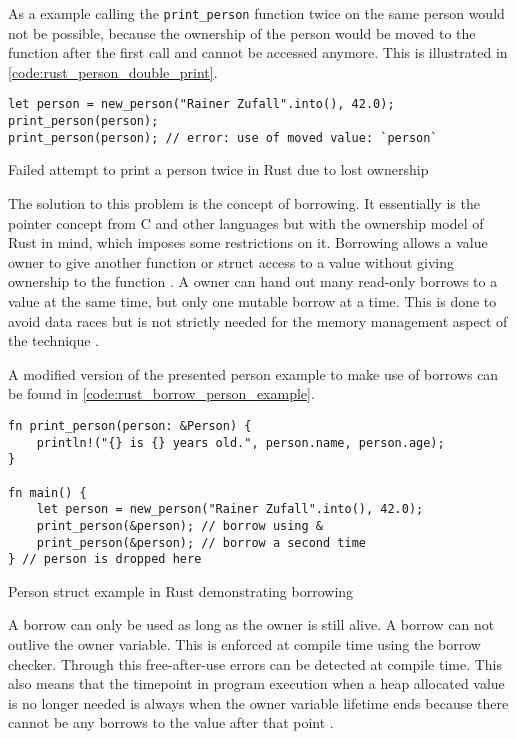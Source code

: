 As a example calling the \texttt{print\_person} function twice on the same person
would not be possible, because the ownership of the person would be moved to the
function after the first call and cannot be accessed anymore.
This is illustrated in \autoref{code:rust_person_double_print}.

\begin{listing}[H] 
    \begin{verbatim}
let person = new_person("Rainer Zufall".into(), 42.0);
print_person(person);
print_person(person); // error: use of moved value: `person`
    \end{verbatim}
    \caption{Failed attempt to print a person twice in Rust due to lost ownership}
    \label{code:rust_person_double_print}
\end{listing}

The solution to this problem is the concept of borrowing.
It essentially is the pointer concept from C and other languages but with
the ownership model of Rust in mind, which imposes some restrictions on it.
Borrowing allows a value owner to give another function or struct
access to a value without giving ownership to the function \cite[2.3 Borrowing]{rust_borrow_formalism_2021}.
A owner can hand out many read-only borrows to a value at the same time,
but only one mutable borrow at a time. This is done to avoid data races but
is not strictly needed for the memory management aspect of the technique \cite[90]{rust_book_2019}.

A modified version of the presented person example to make use of borrows
can be found in \autoref{code:rust_borrow_person_example}.

\begin{listing}[H] 
    \begin{verbatim}
fn print_person(person: &Person) {
    println!("{} is {} years old.", person.name, person.age);
}

fn main() {
    let person = new_person("Rainer Zufall".into(), 42.0);
    print_person(&person); // borrow using &
    print_person(&person); // borrow a second time
} // person is dropped here
    \end{verbatim}
    \caption{Person struct example in Rust demonstrating borrowing}
    \label{code:rust_borrow_person_example}
\end{listing}

A borrow can only be used as long as the owner is still alive.
A borrow can not outlive the owner variable.
This is enforced at compile time using the borrow checker.
Through this free-after-use errors can be detected at compile time.
This also means that the timepoint in program execution when a heap allocated
value is no longer needed is always when the owner variable lifetime ends
because there cannot be any borrows to the value after that point \cite[188]{rust_book_2019} \cite[2.4 Reference Lifetimes]{rust_borrow_formalism_2021} \cite{rust_effective_borrow_checker}.

